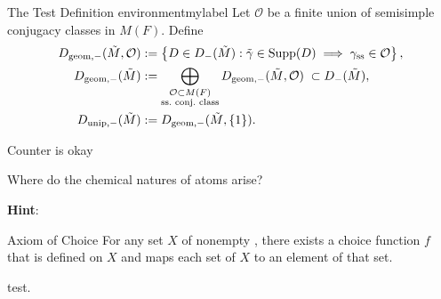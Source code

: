 \documentclass[12pt, a3paper, openany]{book}
\begin{document}
    
\begin{Definition}{The Test Definition environment}{mylabel}
	Let $\mathcal{O}$ be a finite union of semisimple conjugacy classes in $M(F)$. Define
	\begin{align*}
		D_{\mathrm{geom},-}(\tilde{M}, \mathcal{O}) & := \left\{ D \in D_-(\tilde{M}) : \tilde{\gamma} \in \Supp(D) \implies \gamma_{\text{ss}} \in \mathcal{O} \right\}, \\
		D_{\mathrm{geom}, -}(\tilde{M}) & := \bigoplus_{\substack{\mathcal{O} \subset M(F) \\ \text{ss.\ conj.\ class} }} D_{\mathrm{geom},-}(\tilde{M}, \mathcal{O}) \; \subset D_-(\tilde{M}), \\
		D_{\mathrm{unip}, -}(\tilde{M}) & := D_{\mathrm{geom}, -}(\tilde{M}, \{1\}).
	\end{align*}
\end{Definition}
\begin{remark}
Counter is okay
\end{remark}
\begin{remark}
    Where do the chemical natures of atoms arise?
\end{remark}
\begin{claim}
    
\end{claim}
\textbf{Hint}:

\begin{Axiom}{Axiom of Choice}{}
For any set $X$ of nonempty , there exists a choice function $f$ that is defined on $X$ and maps each set of $X$ to an element of that set.
\end{Axiom}
\begin{remark}
    test.
\end{remark}
\end{document}
